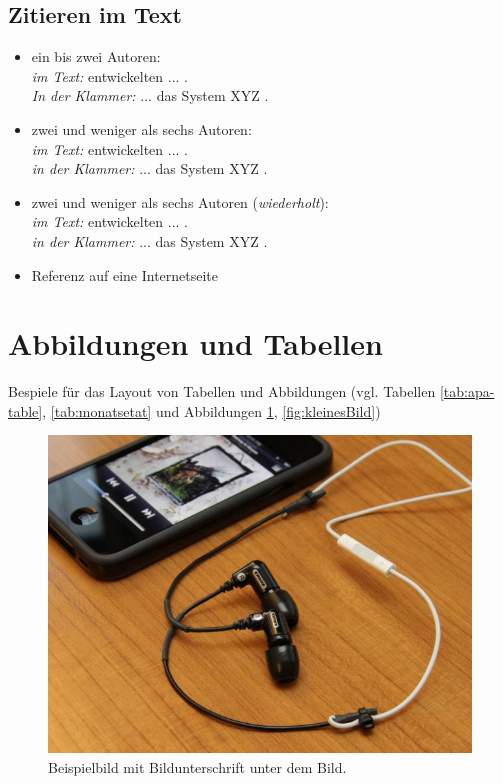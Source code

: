 \subsection{Zitieren im Text}
\begin{itemize}
\item ein bis zwei Autoren:\\ \emph{im Text:} \textcite{oberdorfer:2013a} entwickelten ... . \\ \emph{In der Klammer:} ... das System XYZ \parencite{rehfeld-latoschik:parallelisierung:2009}.
\item zwei und weniger als sechs Autoren:\\ \emph{im Text:} \textcite{lukas:2010} entwickelten ... .\\ \emph{in der Klammer:} ... das System XYZ \parencite{fischbach:2012b}.
\item zwei und weniger als sechs Autoren (\emph{wiederholt}):\\ \emph{im Text:} \textcite{lukas:2010} entwickelten ... .\\ \emph{in der Klammer:} ... das System XYZ \parencite{fischbach:2012b}.
\item Referenz auf eine Internetseite \parencite{hci:2013}
\end{itemize}

\section{Abbildungen und Tabellen}
Bespiele für das Layout von Tabellen und Abbildungen (vgl. Tabellen \ref{tab:apa-table}, \ref{tab:monatsetat} und Abbildungen \ref{fig:grossesBild}, \ref{fig:kleinesBild})

\begin{figure}[!H]
\includegraphics[width=\textwidth]{figures/dummy2.jpg}
\caption{Beispielbild mit Bildunterschrift unter dem Bild.}
\label{fig:grossesBild}
\end{figure}


